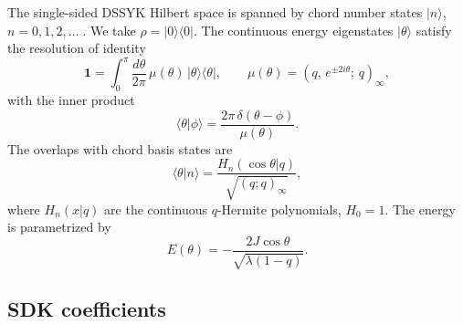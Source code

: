 \documentclass[12pt]{article}
\renewcommand{\qq}[1]{(#1;\,q)_\infty}
\begin{document}
The single-sided DSSYK Hilbert space is spanned by chord number states $|n\rangle$,
$n = 0,1,2,\ldots\;$. We take $\rho = |0\rangle\langle 0|$.
The continuous energy eigenstates $|\theta\rangle$ satisfy the resolution of identity
\begin{equation}
    \mathbf{1} = \int_0^\pi \frac{d\theta}{2\pi}\,\mu(\theta)\,|\theta\rangle\langle\theta|,
    \qquad
    \mu(\theta) = \qq{q,\,e^{\pm 2i\theta}},
    \label{eq:resolution}
\end{equation}
with the inner product 
\begin{equation}
    \langle\theta|\phi\rangle = \frac{2\pi\,\delta(\theta-\phi)}{\mu(\theta)}.
    \label{eq:inner_product}
\end{equation}
The overlaps with chord basis states are
\begin{equation}
    \langle\theta|n\rangle = \frac{H_n(\cos\theta| q)}{\sqrt{(q;q)_\infty}},
    \label{eq:overlap}
\end{equation}
where $H_n(x| q)$ are the continuous $q$-Hermite polynomials, $H_0 = 1$.
The energy is parametrized by
\begin{equation}
    E(\theta) = -\frac{2J\cos\theta}{\sqrt{\lambda(1-q)}}.
    \label{eq:dispersion}
\end{equation}

\subsection{SDK coefficients}
\end{document}
